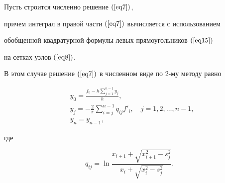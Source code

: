 \begin{thm}


Пусть строится численно решение $(\ref{eq7})$,


причем интеграл в правой части $(\ref{eq7})$ вычисляется с использованием


обобщенной квадратурной формулы левых прямоугольников $(\ref{eq15})$


на сетках узлов $(\ref{eq8})$.


В этом случае решение $(\ref{eq7})$ в численном виде по $2$-му методу равно


\begin{equation}


\label{eq16}


\begin{split}


&y_0=\frac{f_0-h\sum\limits_{j=1}^{n-1}y_j}{h}, \\


&y_j=-\frac2{\pi}\sum\limits_{i=j}^{n-1}q_{ij}f'_i,


\quad j=1,2,\dotsc,n-1, \\


&y_n=y_{n-1},


\end{split}


\end{equation}


где


$$




q_{ij}=\ln\frac{x_{i+1}+\sqrt{x_{i+1}^2-s_j^2}}{x_i+\sqrt{x_i^2-s_j^2}}.




$$


\end{thm}





